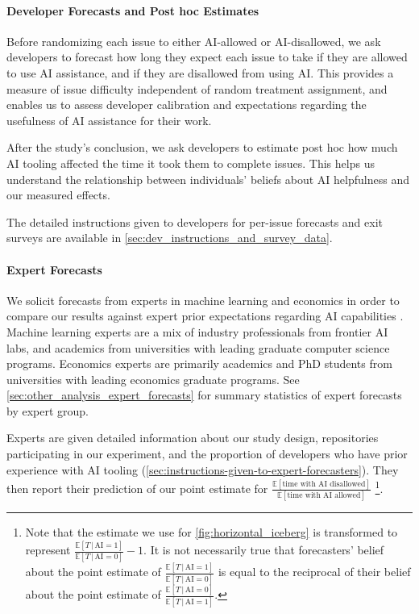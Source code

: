 \documentclass{article}
\begin{document}
\paragraph*{Developer Forecasts and Post hoc Estimates}
Before randomizing each issue to either AI-allowed or AI-disallowed, we ask developers to forecast how long they expect each issue to take if they are allowed to use AI assistance, and if they are disallowed from using AI. 
This provides a measure of issue difficulty independent of random treatment assignment, and enables us to assess developer calibration and expectations regarding the usefulness of AI assistance for their work. 

After the study's conclusion, we ask developers to estimate post hoc how much AI tooling affected the time it took them to complete issues. This helps us understand the relationship between individuals' beliefs about AI helpfulness and our measured effects.

The detailed instructions given to developers for per-issue forecasts and exit surveys are available in \autoref{sec:dev_instructions_and_survey_data}.


\paragraph*{Expert Forecasts}
\label{sec:expert_forecasts}

We solicit forecasts from experts in machine learning and economics in order to compare our results against expert prior expectations regarding AI capabilities \cite{PilotinganElicitation}. Machine learning experts are a mix of industry professionals from frontier AI labs, and academics from universities with leading graduate computer science programs. Economics experts are primarily academics and PhD students from universities with leading economics graduate programs. See \autoref{sec:other_analysis_expert_forecasts} for summary statistics of expert forecasts by expert group. %

Experts are given detailed information about our study design, repositories participating in our experiment, and the proportion of developers who have prior experience with AI tooling (\autoref{sec:instructions-given-to-expert-forecasters}). They then report their prediction of our point estimate for 
$\frac{\mathbb{E}[\text{time with AI disallowed}]}{\mathbb{E}[\text{time with AI allowed}]}$
\footnote{Note that the estimate we use for \autoref{fig:horizontal_iceberg} is transformed to represent $\frac{\mathbb{E}[T\,|\,\text{AI}=1]}{\mathbb{E}[T\,|\,\text{AI}=0]} - 1$. It is not necessarily true that forecasters' belief about the point estimate of $\frac{\mathbb{E}[T\,|\,\text{AI}=1]}{\mathbb{E}[T\,|\,\text{AI}=0]}$ is equal to the reciprocal of their belief about the point estimate of $\frac{\mathbb{E}[T\,|\,\text{AI}=0]}{\mathbb{E}[T\,|\,\text{AI}=1]}$.}.
\end{document}

